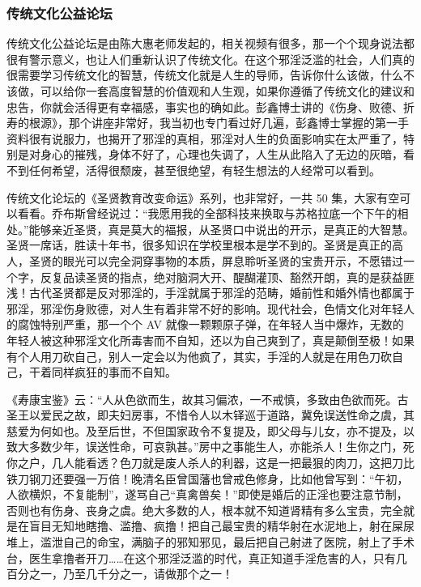 \subsubsection{传统文化公益论坛}

传统文化公益论坛是由陈大惠老师发起的，相关视频有很多，那一个个现身说法都很有警示意义，也让人们重新认识了传统文化。在这个邪淫泛滥的社会，人们真的很需要学习传统文化的智慧，传统文化就是人生的导师，告诉你什么该做，什么不该做，可以给你一套高度智慧的价值观和人生观，如果你遵循了传统文化的建议和忠告，你就会活得更有幸福感，事实也的确如此。彭鑫博士讲的《伤身、败德、折寿的根源》，那个讲座非常好，我当初也专门看过好几遍，彭鑫博士掌握的第一手资料很有说服力，也揭开了邪淫的真相，邪淫对人生的负面影响实在太严重了，特别是对身心的摧残，身体不好了，心理也失调了，人生从此陷入了无边的灰暗，看不到任何希望，活得很颓废，甚至很绝望，有轻生想法的人经常可以看到。

传统文化论坛的《圣贤教育改变命运》系列，也非常好，一共 50 集，大家有空可以看看。乔布斯曾经说过：“我愿用我的全部科技来换取与苏格拉底一个下午的相处。”能够亲近圣贤，真是莫大的福报，从圣贤口中说出的开示，是真正的大智慧。圣贤一席话，胜读十年书，很多知识在学校里根本是学不到的。圣贤是真正的高人，圣贤的眼光可以完全洞穿事物的本质，屏息聆听圣贤的宝贵开示，不愿错过一个字，反复品读圣贤的指点，绝对脑洞大开、醍醐灌顶、豁然开朗，真的是获益匪浅！古代圣贤都是反对邪淫的，手淫就属于邪淫的范畴，婚前性和婚外情也都属于邪淫，邪淫伤身败德，对人生有着非常不好的影响。现代社会，色情文化对年轻人的腐蚀特别严重，那一个个 AV 就像一颗颗原子弹，在年轻人当中爆炸，无数的年轻人被这种邪淫文化所毒害而不自知，还以为自己爽到了，真是颠倒至极！如果有个人用刀砍自己，别人一定会以为他疯了，其实，手淫的人就是在用色刀砍自己，干着同样疯狂的事而不自知。

《寿康宝鉴》云：“人从色欲而生，故其习偏浓，一不戒慎，多致由色欲而死。古圣王以爱民之故，即夫妇房事，不惜令人以木铎巡于道路，冀免误送性命之虞，其慈爱为何如也。及至后世，不但国家政令不复提及，即父母与儿女，亦不提及，以致大多数少年，误送性命，可哀孰甚。”房中之事能生人，亦能杀人！生你之门，死你之户，几人能看透？色刀就是废人杀人的利器，这是一把最狠的肉刀，这把刀比铁刀钢刀还要强一万倍！晚清名臣曾国藩也曾戒色修身，比如他曾写到：“午初，人欲横炽，不复能制”，遂骂自己“真禽兽矣！”即使是婚后的正淫也要注意节制，否则也有伤身、丧身之虞。绝大多数的人，根本就不知道肾精有多么宝贵，完全就是在盲目无知地瞎撸、滥撸、疯撸！把自己最宝贵的精华射在水泥地上，射在屎尿堆上，滥泄自己的命宝，满脑子的邪知邪见，最后把自己射进了医院，射上了手术台，医生拿撸者开刀……在这个邪淫泛滥的时代，真正知道手淫危害的人，只有几百分之一，乃至几千分之一，请做那个之一！

